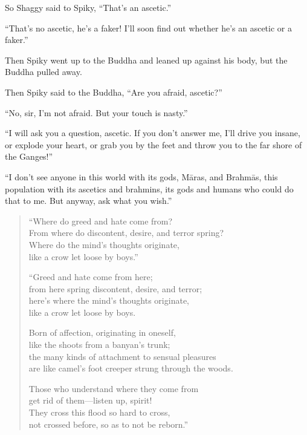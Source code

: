 \documentclass[12pt,openany]{book}%
\begin{document}
So Shaggy said to Spiky, “That’s an ascetic.” 

“That’s no ascetic, he’s a faker! I’ll soon find out whether he’s an ascetic or a faker.” 

Then Spiky went up to the Buddha and leaned up against his body, but the Buddha pulled away. 

Then Spiky said to the Buddha, “Are you afraid, ascetic?” 

“No, sir, I’m not afraid. But your touch is nasty.” 

“I will ask you a question, ascetic. If you don’t answer me, I’ll drive you insane, or explode your heart, or grab you by the feet and throw you to the far shore of the Ganges!” 

“I don’t see anyone in this world with its gods, \textsanskrit{Māras}, and \textsanskrit{Brahmās}, this population with its ascetics and brahmins, its gods and humans who could do that to me. But anyway, ask what you wish.” 

\begin{verse}%
“Where do greed and hate come from? \\
From where do discontent, desire, and terror spring? \\
Where do the mind’s thoughts originate, \\
like a crow let loose by boys.” 

“Greed and hate come from here; \\
from here spring discontent, desire, and terror; \\
here’s where the mind’s thoughts originate, \\
like a crow let loose by boys. 

Born of affection, originating in oneself, \\
like the shoots from a banyan’s trunk; \\
the many kinds of attachment to sensual pleasures \\
are like camel’s foot creeper strung through the woods. 

Those who understand where they come from \\
get rid of them—listen up, spirit! \\
They cross this flood so hard to cross, \\
not crossed before, so as to not be reborn.” 

%
\end{verse}
\end{document}
